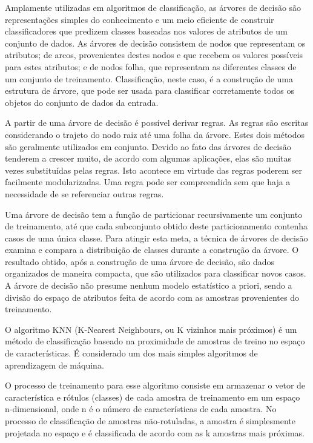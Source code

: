 Amplamente utilizadas em algoritmos de classificação, as árvores de decisão são representações simples do conhecimento e um meio eficiente de construir classificadores que predizem classes baseadas nos valores de atributos de um conjunto de dados. As árvores de decisão consistem de nodos que representam os atributos; de arcos, provenientes destes nodos e que recebem os valores possíveis para estes atributos; e de nodos folha, que representam as diferentes classes de um conjunto de treinamento. Classificação, neste caso, é a construção de uma estrutura de árvore, que pode ser usada para classificar corretamente todos os objetos do conjunto de dados da entrada.

A partir de uma árvore de decisão é possível derivar regras. As regras são escritas considerando o trajeto do nodo raiz até uma folha da árvore. Estes dois métodos são geralmente utilizados em conjunto. Devido ao fato das árvores de decisão tenderem a crescer muito, de acordo com algumas aplicações, elas são muitas vezes substituídas pelas regras. Isto acontece em virtude das regras poderem ser facilmente modularizadas. Uma regra pode ser compreendida sem que haja a necessidade de se referenciar outras regras.

Uma árvore de decisão tem a função de particionar recursivamente um conjunto de treinamento, até que cada subconjunto obtido deste particionamento contenha casos de uma única classe. Para atingir esta meta, a técnica de árvores de decisão examina e compara a distribuição de classes durante a construção da árvore. O resultado obtido, após a construção de uma árvore de decisão, são dados organizados de maneira compacta, que são utilizados para classificar novos casos. A árvore de decisão não presume nenhum modelo estatístico a priori, sendo a divisão do espaço de atributos feita de acordo com as amostras provenientes do treinamento.

O algoritmo KNN (K-Nearest Neighbours, ou K vizinhos mais próximos) \cite{cover:1967} é um método de classificação baseado na proximidade de amostras de treino no espaço de características. É considerado um dos mais simples algoritmos de aprendizagem de máquina.

O processo de treinamento para esse algoritmo consiste em armazenar o vetor de característica e rótulos (classes) de cada amostra de treinamento em um espaço n-dimensional, onde n é o número de características de cada amostra. No processo de classificação de amostras não-rotuladas, a amostra é simplesmente projetada no espaço e é classificada de acordo com as k amostras mais próximas.

